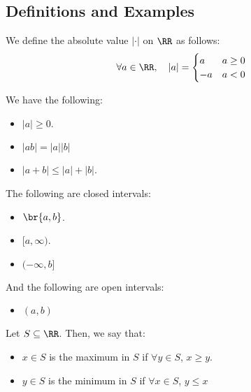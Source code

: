 \documentclass[openany]{book}
\begin{document}
\subsection{Definitions and Examples}
\begin{defn}
	We define the absolute value $\lvert \cdot \rvert$ on $\RR$ as follows:
	\begin{equation*}
		\forall a \in \RR, \quad \lvert a \rvert = \begin{cases}
			a & a \geq 0 \\
			-a & a < 0
			\end{cases}
	\end{equation*}
\end{defn}

\begin{thm}
	We have the following:
	\begin{itemize}
		\item $\lvert a \rvert \geq 0$.
		\item $\lvert ab \rvert = \lvert a \rvert\lvert b \rvert$
		\item $\lvert a + b \rvert \leq \lvert a \rvert + \lvert b \rvert$.
	\end{itemize}
\end{thm}

\begin{defn}[Intervals]
	The following are closed intervals:
	\begin{itemize}
		\item $\br{a,b}$.
		\item $[a, \infty)$.
		\item $(-\infty, b]$
	\end{itemize}
	
	And the following are open intervals:
	\begin{itemize}
		\item $(a,b)$
	\end{itemize}
\end{defn}

\begin{defn}
	Let $S \subseteq \RR$. Then, we say that:
	\begin{itemize}
		\item $x \in S$ is the maximum in $S$ if $\forall y \in S$, $x \geq y$.
		\item $y \in S$ is the minimum in $S$ if $\forall x \in S$, $y \leq x$
	\end{itemize}
\end{defn}
\end{document}
